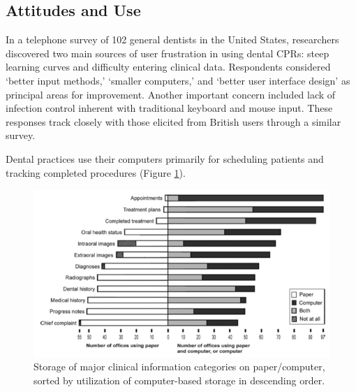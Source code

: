 \documentclass[11pt]{article}
\begin{document}
\subsection{Attitudes and Use}
In a telephone survey of 102 general dentists in the United States, researchers discovered two main sources of user frustration in using dental CPRs: steep learning curves and difficulty entering clinical data\cite{Schleyer2006Clinical-Comput}. Respondents considered `better input methods,' `smaller computers,' and `better user interface design' as principal areas for improvement. Another important concern included lack of infection control inherent with traditional keyboard and mouse input. These responses track closely with those elicited from British users through a similar survey\cite{John2003Questionnaire-s}.

Dental practices use their computers primarily for scheduling patients and tracking completed procedures (Figure \ref{use}).\label{fig:4}
\begin{figure}[h]
\begin{center}
\includegraphics[width=\textwidth]{papervscomp.jpg}
\end{center}
\caption{Storage of major clinical information categories on paper/computer, sorted by utilization of computer-based storage in descending order\cite{Schleyer2007A-Qualitative-I}.}
\label{use}
\end{figure}
\end{document}
